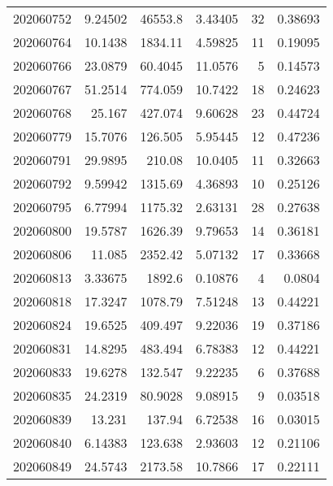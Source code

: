 \begin{tabular}{rrrrrr}
 202060752 &          9.24502 &    46553.8    &            3.43405 &          32 & 0.38693 \\
 202060764 &         10.1438  &     1834.11   &            4.59825 &          11 & 0.19095 \\
 202060766 &         23.0879  &       60.4045 &           11.0576  &           5 & 0.14573 \\
 202060767 &         51.2514  &      774.059  &           10.7422  &          18 & 0.24623 \\
 202060768 &         25.167   &      427.074  &            9.60628 &          23 & 0.44724 \\
 202060779 &         15.7076  &      126.505  &            5.95445 &          12 & 0.47236 \\
 202060791 &         29.9895  &      210.08   &           10.0405  &          11 & 0.32663 \\
 202060792 &          9.59942 &     1315.69   &            4.36893 &          10 & 0.25126 \\
 202060795 &          6.77994 &     1175.32   &            2.63131 &          28 & 0.27638 \\
 202060800 &         19.5787  &     1626.39   &            9.79653 &          14 & 0.36181 \\
 202060806 &         11.085   &     2352.42   &            5.07132 &          17 & 0.33668 \\
 202060813 &          3.33675 &     1892.6    &            0.10876 &           4 & 0.0804  \\
 202060818 &         17.3247  &     1078.79   &            7.51248 &          13 & 0.44221 \\
 202060824 &         19.6525  &      409.497  &            9.22036 &          19 & 0.37186 \\
 202060831 &         14.8295  &      483.494  &            6.78383 &          12 & 0.44221 \\
 202060833 &         19.6278  &      132.547  &            9.22235 &           6 & 0.37688 \\
 202060835 &         24.2319  &       80.9028 &            9.08915 &           9 & 0.03518 \\
 202060839 &         13.231   &      137.94   &            6.72538 &          16 & 0.03015 \\
 202060840 &          6.14383 &      123.638  &            2.93603 &          12 & 0.21106 \\
 202060849 &         24.5743  &     2173.58   &           10.7866  &          17 & 0.22111 \\

\end{tabular}
